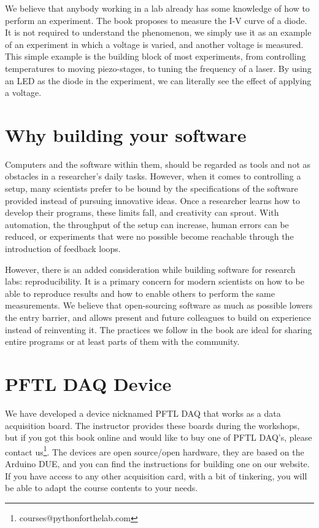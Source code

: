 We believe that anybody working in a lab already has some knowledge of how to perform an experiment. The book proposes to measure the I-V curve of a diode. It is not required to understand the phenomenon, we simply use it as an example of an experiment in which a voltage is varied, and another voltage is measured. This simple example is the building block of most experiments, from controlling temperatures to moving piezo-stages, to tuning the frequency of a laser. By using an LED as the diode in the experiment, we can literally see the effect of applying a voltage.

\section{Why building your software}\label{sec:why-building-your-software}
Computers and the software within them, should be regarded as tools and not as obstacles in a researcher's daily tasks. However, when it comes to controlling a setup, many scientists prefer to be bound by the specifications of the software provided instead of pursuing innovative ideas. Once a researcher learns how to develop their programs, these limits fall, and creativity can sprout. With automation, the throughput of the setup can increase, human errors can be reduced, or experiments that were no possible become reachable through the introduction of feedback loops.

However, there is an added consideration while building software for research labs: reproducibility. It is a primary concern for modern scientists on how to be able to reproduce results and how to enable others to perform the same measurements. We believe that open-sourcing software as much as possible lowers the entry barrier, and allows present and future colleagues to build on experience instead of reinventing it. The practices we follow in the book are ideal for sharing entire programs or at least parts of them with the community.

\section{PFTL DAQ Device}\label{sec:pftl-daq-device}
We have developed a device nicknamed {PFTL DAQ} that works as a data acquisition board. The instructor provides these boards during the workshops, but if you got this book online and would like to buy one of PFTL DAQ's, please contact us\footnote{courses@pythonforthelab.com}. The devices are open source/open hardware, they are based on the Arduino DUE, and you can find the instructions for building one on our website. If you have access to any other acquisition card, with a bit of tinkering, you will be able to adapt the course contents to your needs.

